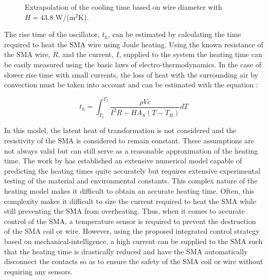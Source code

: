 \begin{figure}[htb!] %
  \centering
  \resizebox{0.8\textwidth}{!}{}
  \caption{Extrapolation of the cooling time based on wire diameter with $H = 43.8$ W/(m$^2$K).}
  \label{fig:cooling-time-extrapolation}
\end{figure}

The rise time of the oscillator, $t_h$, can be estimated by calculating the time required to heat the SMA wire using Joule heating. Using the known resistance of the SMA wire, $R$, and the current, $I$, supplied to the system the heating time can be easily measured using the basic laws of electro-thermodynamics. In the case of slower rise time with small currents, the loss of heat with the surrounding air by convection must be taken into account and can be estimated with the equation :

\begin{equation}\label{eq:heatingtime}
  t_h = \int_{T_1}^{T_2} \frac{\rho Vc}{I^2R-HA_S(T-T_R)} dT
\end{equation}

In this model, the latent heat of transformation is not considered and the resistivity of the SMA is considered to remain constant. These assumptions are not always valid but can still serve as a reasonable approximation of the heating time. The work by \cite{liuActuationFrequencyModeling2021} has established an extensive numerical model capable of predicting the heating times quite accurately but requires extensive experimental testing of the material and environmental constants. This complex nature of the heating model makes it difficult to obtain an accurate heating time. Often, this complexity makes it difficult to size the current required to heat the SMA while still preventing the SMA from overheating. Thus, when it comes to accurate control of the SMA, a temperature sensor is required to prevent the destruction of the SMA coil or wire. However, using the proposed integrated control strategy based on mechanical-intelligence, a high current can be supplied to the SMA such that the heating time is drastically reduced and have the SMA automatically disconnect the contacts so as to ensure the safety of the SMA coil or wire without requiring any sensors.

